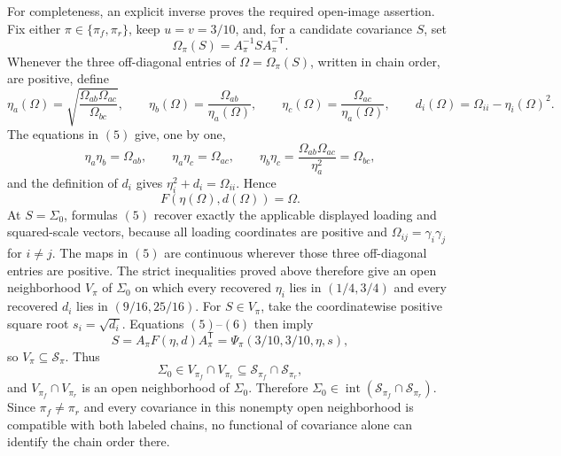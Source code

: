 For completeness, an explicit inverse proves the required open-image assertion.  Fix either \(\pi\in\{\pi_f,\pi_r\}\), keep \(u=v=3/10\), and, for a candidate covariance \(S\), set
\[
 \Omega_\pi(S)=A_\pi^{-1}S A_\pi^{-\mathsf T}.
\]
Whenever the three off-diagonal entries of \(\Omega=\Omega_\pi(S)\), written in chain order, are positive, define
\[
 \eta_a(\Omega)=\sqrt{\frac{\Omega_{ab}\Omega_{ac}}{\Omega_{bc}}},
 \qquad
 \eta_b(\Omega)=\frac{\Omega_{ab}}{\eta_a(\Omega)},
 \qquad
 \eta_c(\Omega)=\frac{\Omega_{ac}}{\eta_a(\Omega)},
 \qquad
 d_i(\Omega)=\Omega_{ii}-\eta_i(\Omega)^2.
 \tag{5}
\]
The equations in \((5)\) give, one by one,
\[
 \eta_a\eta_b=\Omega_{ab},\qquad
 \eta_a\eta_c=\Omega_{ac},\qquad
 \eta_b\eta_c
 =\frac{\Omega_{ab}\Omega_{ac}}{\eta_a^2}
 =\Omega_{bc},
\]
and the definition of \(d_i\) gives \(\eta_i^2+d_i=\Omega_{ii}\).  Hence
\[
 F(\eta(\Omega),d(\Omega))=\Omega.
 \tag{6}
\]
At \(S=\Sigma_0\), formulas \((5)\) recover exactly the applicable displayed loading and squared-scale vectors, because all loading coordinates are positive and \(\Omega_{ij}=\gamma_i\gamma_j\) for \(i\ne j\).  The maps in \((5)\) are continuous wherever those three off-diagonal entries are positive.  The strict inequalities proved above therefore give an open neighborhood \(V_\pi\) of \(\Sigma_0\) on which every recovered \(\eta_i\) lies in \((1/4,3/4)\) and every recovered \(d_i\) lies in \((9/16,25/16)\).  For \(S\in V_\pi\), take the coordinatewise positive square root \(s_i=\sqrt{d_i}\).  Equations \((5)\)--\((6)\) then imply
\[
 S=A_\pi F(\eta,d)A_\pi^{\mathsf T}
 =\Psi_\pi(3/10,3/10,\eta,s),
\]
so \(V_\pi\subseteq\mathcal S_\pi\).  Thus
\[
 \Sigma_0\in V_{\pi_f}\cap V_{\pi_r}
 \subseteq\mathcal S_{\pi_f}\cap\mathcal S_{\pi_r},
\]
and \(V_{\pi_f}\cap V_{\pi_r}\) is an open neighborhood of \(\Sigma_0\).  Therefore \(\Sigma_0\in\operatorname{int}(\mathcal S_{\pi_f}\cap\mathcal S_{\pi_r})\).  Since \(\pi_f\ne\pi_r\) and every covariance in this nonempty open neighborhood is compatible with both labeled chains, no functional of covariance alone can identify the chain order there.
